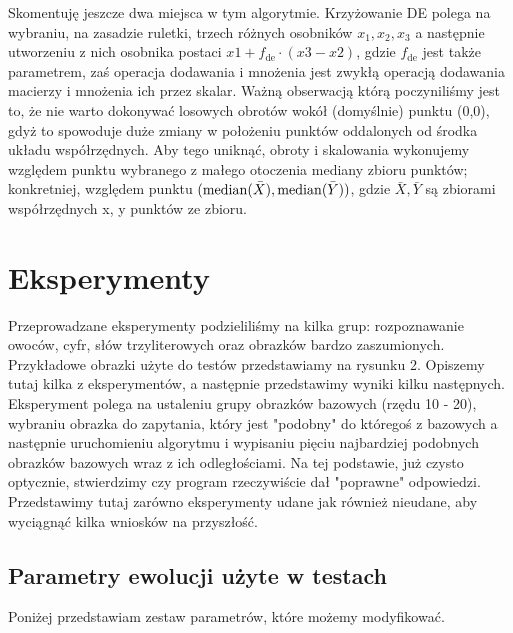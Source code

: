 \documentclass[a4paper,12pt,leqno]{article}
\begin{document}
Skomentuję jeszcze dwa miejsca w tym algorytmie.
Krzyżowanie DE polega na wybraniu, na zasadzie ruletki, trzech różnych osobników $x_1, x_2, x_3$ a następnie utworzeniu z nich osobnika postaci
$x1 + f_\text{de}\cdot(x3-x2)$, gdzie $f_\text{de}$ jest także parametrem, zaś operacja dodawania i mnożenia jest zwykłą operacją dodawania macierzy 
i mnożenia ich przez skalar.
Ważną obserwacją którą poczyniliśmy jest to, że nie warto dokonywać losowych obrotów wokół (domyślnie) punktu (0,0), 
gdyż to spowoduje duże zmiany w położeniu punktów oddalonych od środka układu współrzędnych. Aby tego uniknąć, obroty i skalowania wykonujemy względem punktu wybranego z małego otoczenia
mediany zbioru punktów; konkretniej, względem punktu $(\mathrm{median}(\bar{X}), \mathrm{median}(\bar{Y}))$, gdzie $\bar{X}, \bar{Y}$ są zbiorami współrzędnych x, y punktów ze zbioru.

\section{Eksperymenty}
Przeprowadzane eksperymenty podzieliliśmy na kilka grup: rozpoznawanie owoców, cyfr, słów trzyliterowych oraz obrazków bardzo zaszumionych.
Przykładowe obrazki użyte do testów przedstawiamy na rysunku 2.
Opiszemy tutaj kilka z eksperymentów, a następnie przedstawimy wyniki kilku następnych.
Eksperyment polega na ustaleniu grupy obrazków bazowych (rzędu 10 - 20), wybraniu obrazka do zapytania, który jest "podobny" do któregoś z bazowych a następnie uruchomieniu algorytmu
i wypisaniu pięciu najbardziej podobnych obrazków bazowych wraz z ich odległościami. Na tej podstawie, już czysto optycznie, stwierdzimy czy program rzeczywiście dał "poprawne" odpowiedzi.
Przedstawimy tutaj zarówno eksperymenty udane jak również nieudane, aby wyciągnąć kilka wniosków na przyszłość.

\subsection{Parametry ewolucji użyte w testach}
Poniżej przedstawiam zestaw parametrów, które możemy modyfikować.
\end{document}
